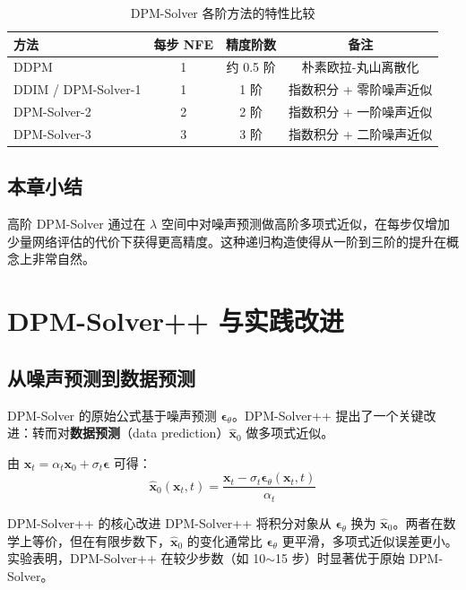 \documentclass[a4paper]{article}
\begin{document}
\begin{table}[H]
\centering
\begin{tabular}{lccc}
\toprule
\textbf{方法} & \textbf{每步 NFE} & \textbf{精度阶数} & \textbf{备注} \\
\midrule
DDPM & 1 & 约 0.5 阶 & 朴素欧拉-丸山离散化 \\
DDIM / DPM-Solver-1 & 1 & 1 阶 & 指数积分 + 零阶噪声近似 \\
DPM-Solver-2 & 2 & 2 阶 & 指数积分 + 一阶噪声近似 \\
DPM-Solver-3 & 3 & 3 阶 & 指数积分 + 二阶噪声近似 \\
\bottomrule
\end{tabular}
\caption{DPM-Solver 各阶方法的特性比较}
\end{table}

\subsection{本章小结}

高阶 DPM-Solver 通过在 $\lambda$ 空间中对噪声预测做高阶多项式近似，在每步仅增加少量网络评估的代价下获得更高精度。这种递归构造使得从一阶到三阶的提升在概念上非常自然。


\section{DPM-Solver++ 与实践改进}

\subsection{从噪声预测到数据预测}

DPM-Solver 的原始公式基于噪声预测 $\boldsymbol{\epsilon}_\theta$。DPM-Solver++ 提出了一个关键改进：转而对\textbf{数据预测}（data prediction）$\hat{\mathbf{x}}_0$ 做多项式近似。

由 $\mathbf{x}_t = \alpha_t \mathbf{x}_0 + \sigma_t \boldsymbol{\epsilon}$ 可得：
$$\hat{\mathbf{x}}_0(\mathbf{x}_t, t) = \frac{\mathbf{x}_t - \sigma_t \boldsymbol{\epsilon}_\theta(\mathbf{x}_t, t)}{\alpha_t}$$

\begin{importantbox}{DPM-Solver++ 的核心改进}
DPM-Solver++ 将积分对象从 $\boldsymbol{\epsilon}_\theta$ 换为 $\hat{\mathbf{x}}_0$。两者在数学上等价，但在有限步数下，$\hat{\mathbf{x}}_0$ 的变化通常比 $\boldsymbol{\epsilon}_\theta$ 更平滑，多项式近似误差更小。实验表明，DPM-Solver++ 在较少步数（如 10$\sim$15 步）时显著优于原始 DPM-Solver。
\end{importantbox}
\end{document}
